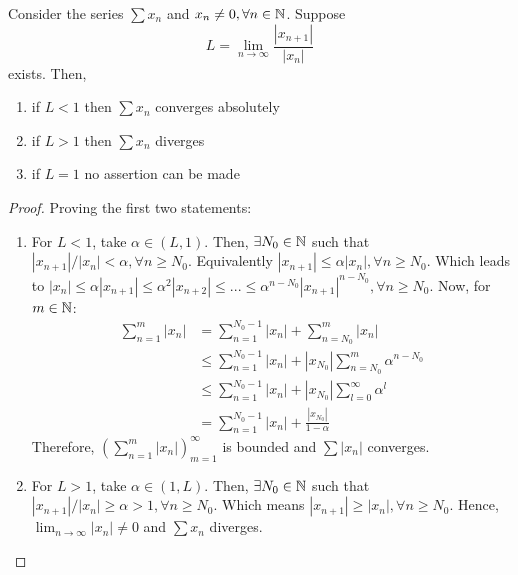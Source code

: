 \begin{theorem}
    Consider the series $\sum x_n$ and $x_n \neq 0, \forall n \in \mathbb{N}$. Suppose
    \begin{equation}
        L = \lim \limits_{n \to \infty} \frac{|x_{n+1}|}{|x_n|}
    \end{equation}
    exists. Then,
    \begin{enumerate}
        \item if $L < 1$ then $\sum x_n$ converges absolutely
        \item if $L > 1$ then $\sum x_n$ diverges
        \item if $L = 1$ no assertion can be made
    \end{enumerate}
\end{theorem}

\begin{proof}
    Proving the first two statements:
    \begin{enumerate}
        \item For $L < 1$, take $\alpha \in (L, 1)$. Then, $\exists N_0 \in \mathbb{N}$ such that $|x_{n+1}|/|x_n| < \alpha, \forall n \geq N_0$. Equivalently $|x_{n+1}| \leq \alpha |x_n|, \forall n \geq N_0$. Which leads to $|x_n| \leq \alpha |x_{n+1}| \leq \alpha^2 |x_{n+2}| \leq ... \leq \alpha^{n-N_0} |x_{n+1}|^{n-N_0}, \forall n \geq N_0$. Now, for $m \in \mathbb{N}$:
        \begin{align*}
            \sum \limits_{n=1}^m |x_n| &= \sum \limits_{n=1}^{N_0-1}|x_n| + \sum \limits_{n=N_0}^{m}|x_n| \\
            &\leq \sum \limits_{n=1}^{N_0-1}|x_n| + |x_{N_0}| \sum \limits_{n=N_0}^{m} \alpha^{n-N_0} \\
            &\leq \sum \limits_{n=1}^{N_0-1}|x_n| + |x_{N_0}| \sum \limits_{l=0}^{\infty} \alpha^l \\
            &= \sum \limits_{n=1}^{N_0-1}|x_n| + \frac{|x_{N_0}|}{1-\alpha}
        \end{align*}
        Therefore, $( \sum_{n=1}^m |x_n|)_{m=1}^\infty$ is bounded and $\sum |x_n|$ converges.
        \item For $L > 1$, take $\alpha \in (1, L)$. Then, $\exists N_0 \in \mathbb{N}$ such that $|x_{n+1}|/|x_n| \geq \alpha > 1, \forall n \geq N_0$. Which means $|x_{n+1}| \geq |x_n|, \forall n \geq N_0$. Hence, $\lim_{n \to \infty} |x_n| \neq 0$ and $\sum x_n$ diverges.
    \end{enumerate}
\end{proof}


